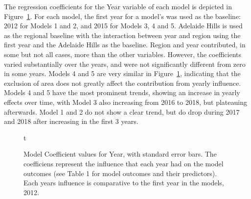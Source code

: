 \documentclass[10pt,letterpaper]{article}
\begin{document}
The regression coefficients for the Year variable of each model is depicted in Figure~\ref{fig:yearly}. For each model, the first year for a model's was used as the baseline: 2012 for Models 1 and 2, and 2015 for Models 3, 4 and 5. Adelaide Hills is used as the regional baseline with the interaction between year and region using the first year and the Adelaide Hills as the baseline. Region and year contributed, in some but not all cases, more than the other variables. However, the coefficients varied substantially over the years, and were not significantly different from zero in some years. Models 4 and 5 are very similar in Figure~\ref{fig:yearly}, indicating that the exclusion of area does not greatly affect the contribution from yearly influence. Models 4 and 5 have the most prominent trends, showing an increase in yearly effects over time, with Model 3 also increasing from 2016 to 2018, but plateauing afterwards. Model 1 and 2 do not show a clear trend, but do drop during 2017 and 2018 after increasing in the first 3 years.
\par
\begin{figure}[htb]
  \caption{Model Coefficient values for Year, with standard error bars. The coefficiens represent the influence that each year had on the model outcomes (see Table 1 for model outcomes and their predictors). Each years influence is comparative to the first year in the models, 2012.}t\label{fig:yearly}
  \end{figure}

%
%
%
%
%
%
%
%
%
\end{document}
